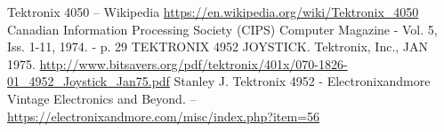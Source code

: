\documentclass[11pt, a4paper]{article}
\begin{document}
\begin{thebibliography}{9}
 Tektronix 4050 -- Wikipedia \url{https://en.wikipedia.org/wiki/Tektronix_4050}
 Canadian Information Processing Society (CIPS) Computer Magazine - Vol. 5, Iss. 1-11, 1974. - p. 29
 TEKTRONIX 4952 JOYSTICK. Tektronix, Inc., JAN 1975. \url{http://www.bitsavers.org/pdf/tektronix/401x/070-1826-01_4952_Joystick_Jan75.pdf}
 Stanley J. Tektronix 4952 - Electronixandmore Vintage Electronics and Beyond. -- \url{https://electronixandmore.com/misc/index.php?item=56}
\end{thebibliography}
\end{document}
